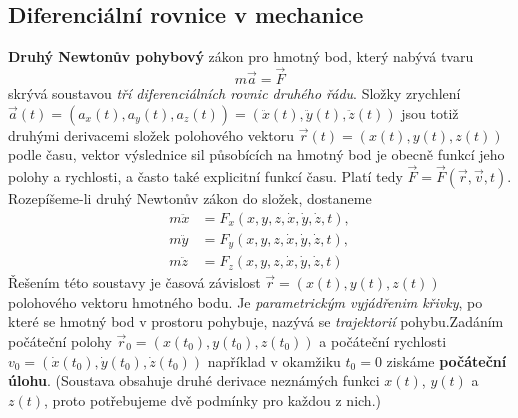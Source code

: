     \subsection{Diferenciální rovnice v mechanice}
      \textbf{Druhý Newtonův pohybový} zákon pro hmotný bod, který nabývá tvaru
      \begin{equation*}
        m\vec{a} = \vec{F}
      \end{equation*}
      skrývá soustavou \emph{tří diferenciálních rovnic druhého řádu}. Složky zrychlení \(\vec{a}(t)
      = (a_x(t), a_y(t), a_z(t)) = (\ddot{x}(t), \ddot{y}(t), \ddot{z}(t))\) jsou totiž druhými
      derivacemi složek polohového vektoru \(\vec{r}(t) = (x(t), y(t), z(t))\) podle času, vektor
      výslednice sil působících na hmotný bod je obecně funkcí jeho polohy a rychlosti, a často také
      explicitní funkcí času. Platí tedy \(\vec{F} = \vec{F}(\vec{r},\vec{v},t)\). Rozepíšeme-li
      druhý Newtonův zákon do složek, dostaneme
      \begin{align*}
        m\ddot{x} & = F_x(x,y,z,\dot{x}, \dot{y}, \dot{z}, t),        \\
        m\ddot{y} & = F_y(x,y,z,\dot{x}, \dot{y}, \dot{z}, t),        \\
        m\ddot{z} & = F_z(x,y,z,\dot{x}, \dot{y}, \dot{z}, t)
      \end{align*}
      Řešením této soustavy je časová závislost \(\vec{r} = (x(t), y(t), z(t))\) polohového vektoru
      hmotného bodu. Je \emph{parametrickým vyjádřenim křivky}, po které se hmotný bod v prostoru
      pohybuje, nazývá se \emph{trajektorií} pohybu.Zadáním počáteční polohy \(\vec{r}_0 = (x(t_0),
      y(t_0), z(t_0))\) a počáteční rychlosti \(v_0 = (\dot{x}(t_0), \dot{y}(t_0), \dot{z}(t_0))\)
      například v okamžiku \(t_0 = 0\) ziskáme \textbf{počáteční úlohu}. (Soustava obsahuje druhé
      derivace neznámých funkci \(x(t)\), \(y(t)\) a \(z(t)\), proto potřebujeme dvě podmínky pro
      každou z nich.) 
      

